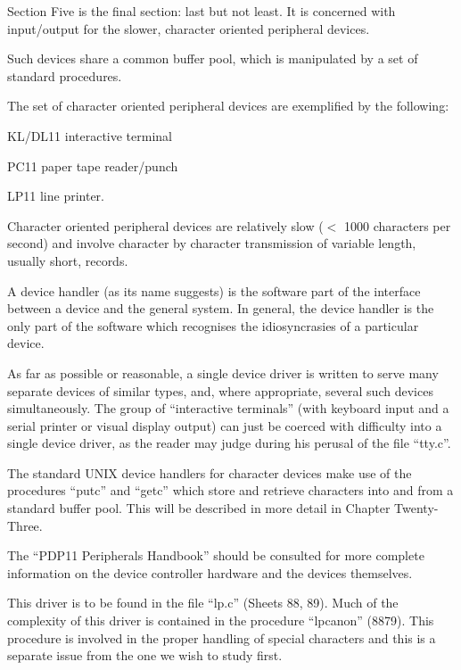 %
%
{\sf Section Five is the final section: last
but not least. It is concerned with
input/output for the slower, character
oriented peripheral devices.

Such devices share a common buffer
pool, which is manipulated by a set of
standard procedures.

The set of character oriented peripheral devices are exemplified by the
following:

\bi
\item KL/DL11 interactive terminal
\item PC11 paper tape reader/punch
\item LP11 line printer.
\ei
}


Character oriented peripheral devices
are relatively slow ($<$ 1000 characters
per second) and involve character by
character transmission of variable
length, usually short, records.

A device handler (as its name suggests)
is the software part of the interface
between a device and the general system. In general, the device handler is
the only part of the software which
recognises the idiosyncrasies of a particular device.

As far as possible or reasonable, a
single device driver is written to
serve many separate devices of similar
types, and, where appropriate, several
such devices simultaneously. The group
of ``interactive terminals'' (with keyboard input and a serial printer or
visual display output) can just be
coerced with difficulty into a single
device driver, as the reader may judge
during his perusal of the file ``tty.c''.

The standard UNIX device handlers for
character devices make use of the procedures ``putc'' and ``getc'' which store
and retrieve characters into and from a
standard buffer pool. This will be
described in more detail in Chapter
Twenty-Three.

The ``PDP11 Peripherals Handbook'' should
be consulted for more complete information on the device controller hardware
and the devices themselves.


This driver is to be found in the file
``lp.c'' (Sheets 88, 89). Much of the
complexity of this driver is contained
in the procedure ``lpcanon'' (8879).
This procedure is involved in the
proper handling of special characters
and this is a separate issue from the
one we wish to study first.

